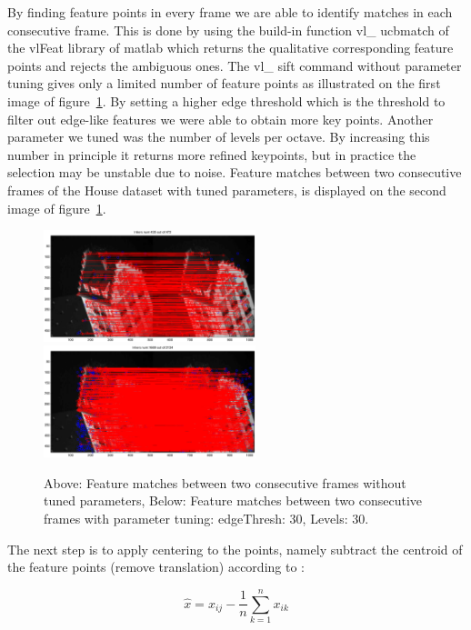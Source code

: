 By finding feature points in every frame we are able to identify matches in each consecutive frame. This is done by using the build-in function vl\_ ucbmatch of the vlFeat library of matlab which returns the qualitative corresponding feature points and rejects the ambiguous ones. The vl\_ sift command without parameter tuning gives only a limited number of feature points as illustrated on the first image of figure~\ref{fig:matches}. By setting a higher edge threshold which is the threshold to filter out edge-like features we were able to obtain more key points. Another parameter we tuned was the number of levels per octave. By increasing this number in principle it returns more refined keypoints, but in practice the selection may be unstable due to noise. Feature matches between two consecutive frames of the House dataset with tuned parameters, is displayed on the second image of figure~\ref{fig:matches}.

\begin{figure}[ht!]
  \centering
    \includegraphics[width=0.55\textwidth]{figures/matchesSimple.eps}\\
    \includegraphics[width=0.55\textwidth]{figures/matchesWithThresh.eps}
    \caption{Above: Feature matches between two consecutive frames without tuned parameters, Below: Feature matches between two consecutive frames with parameter tuning: edgeThresh: 30, Levels: 30.}
    \label{fig:matches}
\end{figure}

The next step is to apply centering to the points, namely subtract the centroid of the feature points (remove translation) according to :

\begin{equation}
\hat{x} = x_{ij} - \frac{1}{n} \sum_{k=1}^{n} x_{ik}
\end{equation}

